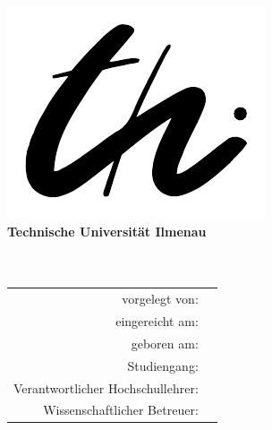 \makeatletter
\begin{titlepage}
\centering
\sffamily
\includegraphics [scale=0.9] {img/tui_logo}\\[1.5ex]
{\bfseries\LARGE Technische Universität Ilmenau}\\[-0.3ex]
{\Large \Fakultaet\\[0.5ex]\Fachgebiet}\\[3em]
{\Large \TypDerArbeit}

\vspace{1em}

\vspace{1ex}

\vfill
\begin{center}
\begin{tabular}{rl}
vorgelegt von:						& \quad \NameDesAutors\\		[1ex]
eingereicht am:						& \quad \eingereichtAm\\		[1ex]
geboren am:							& \quad \GeburtstagUndOrt\\		[1ex]
Studiengang:						& \quad \Studiengang\\			[3ex]

Verantwortlicher Hochschullehrer:	& \quad \Professor\\			[1ex]
Wissenschaftlicher Betreuer:		& \quad \Betreuer\\
\end{tabular}
\end{center}
\end{titlepage}
\makeatother
